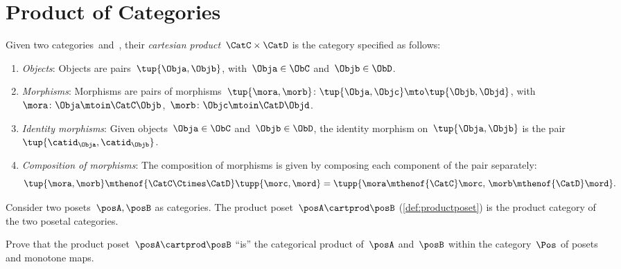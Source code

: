 
\section{Product of Categories}

\begin{ctdefinition}
	\label{def:cartesian-product-category}
	Given two categories~\CatC and~\CatD, their \emph{cartesian product}~$\CatC \times \CatD$ is the category specified as follows:
	\begin{enumerate}
		\item \emph{Objects}: Objects are pairs~$\tup{\Obja,\Objb}$, with~$\Obja\in \ObC$ and~$\Objb\in \ObD$.
		\item \emph{Morphisms}: Morphisms are pairs of morphisms~$\tup{\mora,\morb} \colon \tup{\Obja,\Objc}\mto \tup{\Objb,\Objd}$, with~$\mora\colon \Obja \mtoin\CatC \Objb$,~$\morb\colon \Objc\mtoin\CatD \Objd$.
		\item \emph{Identity morphisms}: Given objects~$\Obja\in \ObC$ and~$\Objb\in \ObD$, the identity morphism on~$\tup{\Obja,\Objb}$ is the pair $\tup{\catid_\Obja ,\catid_\Objb}$.
		\item \emph{Composition of morphisms}: The composition of morphisms is given by composing each component of the pair separately:
		      \begin{equation}
			      \tup{\mora,\morb}\mthenof{\CatC\Ctimes\CatD} \tupp{\morc,\mord}=\tupp{\mora\mthenof{\CatC}\morc,\, \morb \mthenof{\CatD} \mord}.
		      \end{equation}
	\end{enumerate}
\end{ctdefinition}

\begin{example}
	Consider two posets~$\posA,\posB$ as categories.
	The product poset~$\posA\cartprod \posB$ (\cref{def:productposet}) is the product category of the two posetal categories.
\end{example}

\begin{gradedexercise}
	Prove that the product poset~$\posA \cartprod \posB$ ``is'' the categorical product of~$\posA$ and~$\posB$ within the category~$\Pos$ of posets and monotone maps.
\end{gradedexercise}

